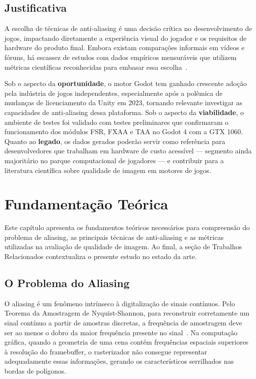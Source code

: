\documentclass[twoside,english,brazilian]{UNISINOSmonografia}
\begin{document}
\section{Justificativa}

A escolha de técnicas de anti-aliasing é uma decisão crítica no desenvolvimento de jogos, impactando diretamente a experiência visual do jogador e os requisitos de hardware do produto final. Embora existam comparações informais em vídeos e fóruns, há escassez de estudos com dados empíricos mensuráveis que utilizem métricas científicas reconhecidas para embasar essa escolha~\cite{feng2025antialiasing}.

Sob o aspecto da \textbf{oportunidade}, o motor Godot tem ganhado crescente adoção pela indústria de jogos independentes, especialmente após a polêmica de mudanças de licenciamento da Unity em 2023, tornando relevante investigar as capacidades de anti-aliasing dessa plataforma. Sob o aspecto da \textbf{viabilidade}, o ambiente de testes foi validado com testes preliminares que confirmaram o funcionamento dos módulos FSR, FXAA e TAA no Godot 4 com a GTX 1060. Quanto ao \textbf{legado}, os dados gerados poderão servir como referência para desenvolvedores que trabalham em hardware de custo acessível — segmento ainda majoritário no parque computacional de jogadores — e contribuir para a literatura científica sobre qualidade de imagem em motores de jogos.

\chapter{Fundamentação Teórica}

Este capítulo apresenta os fundamentos teóricos necessários para compreensão do problema de aliasing, as principais técnicas de anti-aliasing e as métricas utilizadas na avaliação de qualidade de imagem. Ao final, a seção de Trabalhos Relacionados contextualiza o presente estudo no estado da arte.

\section{O Problema do Aliasing}

O aliasing é um fenômeno intrínseco à digitalização de sinais contínuos. Pelo Teorema da Amostragem de Nyquist-Shannon, para reconstruir corretamente um sinal contínuo a partir de amostras discretas, a frequência de amostragem deve ser ao menos o dobro da maior frequência presente no sinal~\cite{real_time_rendering_4th}. Na computação gráfica, quando a geometria de uma cena contém frequências espaciais superiores à resolução do framebuffer, o rasterizador não consegue representar adequadamente essas informações, gerando os característicos serrilhados nas bordas de polígonos.
\end{document}
